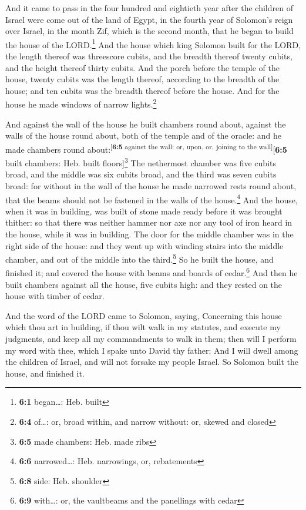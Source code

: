  And it came to pass in the four hundred and eightieth
year after the children of Israel were come out of the land of Egypt, in
the fourth year of Solomon's reign over Israel, in the month Zif, which
is the second month, that he began to build the house of the
LORD.\footnote{\textbf{6:1} began\ldots: Heb. built}  And
the house which king Solomon built for the LORD, the length thereof was
threescore cubits, and the breadth thereof twenty cubits, and the height
thereof thirty cubits.  And the porch before the temple of
the house, twenty cubits was the length thereof, according to the
breadth of the house; and ten cubits was the breadth thereof before the
house.  And for the house he made windows of narrow
lights.\footnote{\textbf{6:4} of\ldots: or, broad within, and narrow
  without: or, skewed and closed}

 And against the wall of the house he built chambers round
about, against the walls of the house round about, both of the temple
and of the oracle: and he made chambers round
about:\textsuperscript{{[}\textbf{6:5} against the wall: or, upon, or,
joining to the wall{]}}{[}\textbf{6:5} built chambers: Heb. built
floors{]}\footnote{\textbf{6:5} made chambers: Heb. made ribs}
 The nethermost chamber was five cubits broad, and the
middle was six cubits broad, and the third was seven cubits broad: for
without in the wall of the house he made narrowed rests round about,
that the beams should not be fastened in the walls of the
house.\footnote{\textbf{6:6} narrowed\ldots: Heb. narrowings, or,
  rebatements}  And the house, when it was in building,
was built of stone made ready before it was brought thither: so that
there was neither hammer nor axe nor any tool of iron heard in the
house, while it was in building.  The door for the middle
chamber was in the right side of the house: and they went up with
winding stairs into the middle chamber, and out of the middle into the
third.\footnote{\textbf{6:8} side: Heb. shoulder}  So he
built the house, and finished it; and covered the house with beams and
boards of cedar.\footnote{\textbf{6:9} with\ldots: or, the vaultbeams
  and the panellings with cedar}  And then he built
chambers against all the house, five cubits high: and they rested on the
house with timber of cedar.

 And the word of the LORD came to Solomon, saying,
 Concerning this house which thou art in building, if
thou wilt walk in my statutes, and execute my judgments, and keep all my
commandments to walk in them; then will I perform my word with thee,
which I spake unto David thy father:  And I will dwell
among the children of Israel, and will not forsake my people Israel.
 So Solomon built the house, and finished it.

